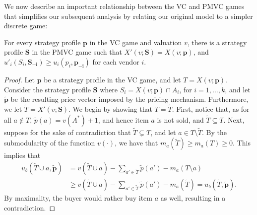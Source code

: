 We now
describe an important relationship between the VC and PMVC games that
simplifies our subsequent analysis by relating our original model to a simpler discrete game:
\begin{proposition}
\label{prop:discrete}
For every strategy profile $\mathbf{p}$ in the VC game and valuation
$v$, there is a strategy
profile $\mathbf{S}$ in the PMVC game such that $X'(v;\mathbf{S}) =
X(v;\mathbf{p})$, and $u'_i(S_i,\mathbf{S_{-i}}) \geq
u_i(p_i,\mathbf{p_{-i}})$ for each vendor $i$.
\end{proposition}
\begin{proof}
Let $\mathbf{p}$ be a strategy profile in the VC game, and let $T=X(v;\mathbf{p})$. Consider the strategy profile $\mathbf{S}$ where $S_i = X(v;\mathbf{p}) \cap A_i$, for $i=1,\ldots,k$, and let $\mathbf{\tilde p}$ be the resulting price vector imposed by the pricing mechanism. Furthermore, we let $\tilde T=X'(v;\mathbf{S})$. We begin by showing that $T=\tilde T$. First, notice that, as for all $a \notin T$, $\tilde p(a)=v(A^*)+1$, and hence item $a$ is not sold, and $\tilde T \subseteq T$. Next, suppose for the sake of contradiction that $\tilde T \subsetneq T$, and let $a \in T \setminus \tilde T$. By the submodularity of the function $v(\cdot)$, we have that $m_a(\tilde T) \geq m_a(T) \geq 0$. This implies that 
\small
\begin{align*}
u_b(\tilde T \cup a, \mathbf{\tilde p})
&= v(\tilde T \cup a) - \sum_{a' \in \tilde T}\tilde p(a') - m_a(T\setminus a) \\
&\geq v(\tilde T \cup a) - \sum_{a' \in \tilde T}\tilde p(a') - m_a(\tilde T)= u_b(\tilde T,\mathbf{\tilde p}).
\end{align*}
\normalsize
By maximality, the buyer would rather buy item $a$ as well, resulting in a contradiction.


\end{proof}
